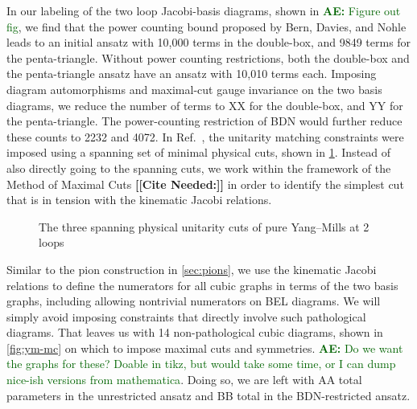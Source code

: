 \documentclass[11pt,letter]{article}
\newcommand{\ace}[1]{\textcolor{darkgreen}{\textbf{AE:}{ #1}}}
\newcommand{\citepls}[1]{{\bf\color{red}[[Cite Needed:#1]]}}
\begin{document}
In our labeling of the two loop Jacobi-basis diagrams, shown in
\ace{Figure out fig}, we find that the power counting bound proposed
by Bern, Davies, and Nohle leads to an initial ansatz with 10,000
terms in the double-box, and 9849 terms for the penta-triangle.
Without power counting restrictions, both the double-box and the
penta-triangle ansatz have an ansatz with 10,010 terms each.  Imposing
diagram automorphisms and maximal-cut gauge invariance on the two
basis diagrams, we reduce the number of terms to XX for the
double-box, and YY for the penta-triangle.  The power-counting
restriction of BDN would further reduce these counts to 2232 and 4072.
In Ref.~\cite{Bern:2015ooa}, the unitarity matching constraints were
imposed using a spanning set of minimal physical cuts, shown in
\cref{fig:ym-spanning}.  Instead of also directly going to the
spanning cuts, we work within the framework of the Method of Maximal
Cuts \citepls{} in order to identify the simplest cut that is in
tension with the kinematic Jacobi relations.

\begin{figure}
  \begin{center}
    \begin{subfigure}{0.3\textwidth}
      \begin{center}
        \LMCut
      \end{center}
    \end{subfigure}
    \begin{subfigure}{0.3\textwidth}
      \begin{center}
        \PhysicalCutOne{}{}{}{}
      \end{center}
    \end{subfigure}
    \begin{subfigure}{0.3\textwidth}
      \begin{center}
        \PhysicalCutTwo{}{}{}{}
      \end{center}
    \end{subfigure}
  \end{center}
  \caption{The three spanning physical unitarity cuts of pure
    Yang--Mills at 2 loops}
  \label{fig:ym-spanning}
\end{figure}

Similar to the pion construction in \cref{sec:pions}, we use the
kinematic Jacobi relations to define the numerators for all cubic
graphs in terms of the two basis graphs, including allowing nontrivial
numerators on BEL diagrams.  We will simply avoid imposing
constraints that directly involve such pathological diagrams.  That
leaves us with 14 non-pathological cubic diagrams, shown in \cref{fig:ym-mc} on which to impose
maximal cuts and symmetries. \ace{Do we want the graphs for these?
  Doable in tikz, but would take some time, or I can dump nice-ish
  versions from mathematica}.  Doing so, we are left with AA total
parameters in the unrestricted ansatz and BB total in the
BDN-restricted ansatz.
\end{document}

